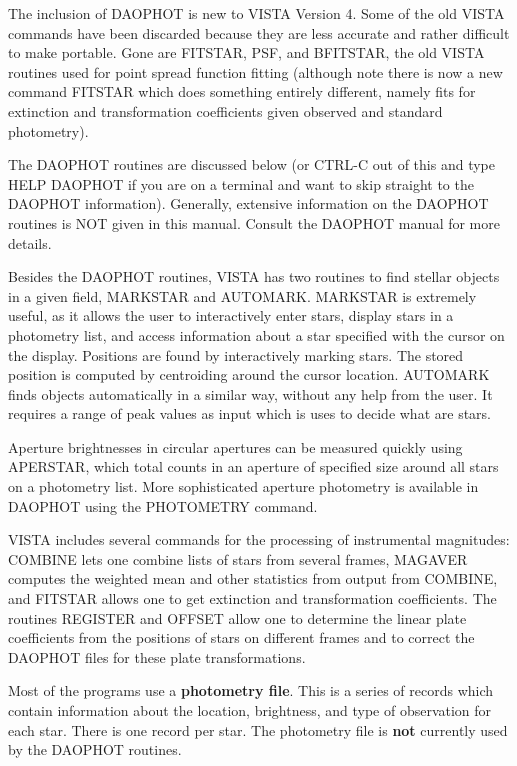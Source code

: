The inclusion of DAOPHOT is new to VISTA Version 4. Some of the old VISTA
commands have been discarded because they are less accurate and rather
difficult to make portable.  Gone are FITSTAR, PSF, and BFITSTAR, the old
VISTA routines used for point spread function fitting (although note there
is now a new command FITSTAR which does something entirely different,
namely fits for extinction and transformation coefficients given observed
and standard photometry).

The DAOPHOT routines are discussed below (or CTRL-C out of this and type
HELP DAOPHOT if you are on a terminal and want to skip straight to the
DAOPHOT information). Generally, extensive information on the DAOPHOT
routines is NOT given in this manual. Consult the DAOPHOT manual for more
details.

Besides the DAOPHOT routines, VISTA has two routines to find stellar
objects in a given field, MARKSTAR and AUTOMARK. MARKSTAR is extremely
useful, as it allows the user to interactively enter stars, display stars
in a photometry list, and access information about a star specified with
the cursor on the display. Positions are found by interactively marking
stars. The stored position is computed by centroiding around the cursor
location. AUTOMARK finds objects automatically in a similar way, without
any help from the user. It requires a range of peak values as input which
is uses to decide what are stars.

Aperture brightnesses in circular apertures can be measured quickly using
APERSTAR, which total counts in an aperture of specified size around all
stars on a photometry list. More sophisticated aperture photometry is
available in DAOPHOT using the PHOTOMETRY command.

VISTA includes several commands for the processing of instrumental
magnitudes: COMBINE lets one combine lists of stars from several frames,
MAGAVER computes the weighted mean and other statistics from output from
COMBINE, and FITSTAR allows one to get extinction and transformation
coefficients. The routines REGISTER and OFFSET allow one to determine the
linear plate coefficients from the positions of stars on different frames
and to correct the DAOPHOT files for these plate transformations. 

Most of the programs use a \textbf{photometry file}.  
This is a series of records
which contain information about the location, brightness, and type of
observation for each star.  There is one record per star. The photometry
file is \textbf{not} currently used by the DAOPHOT routines.

